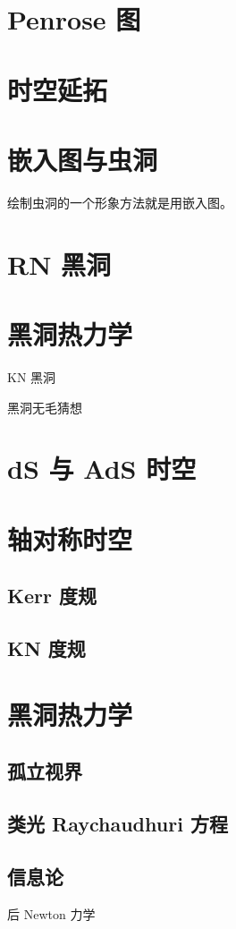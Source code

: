 \section{Penrose 图}

\section{时空延拓}

\section{嵌入图与虫洞}
绘制虫洞的一个形象方法就是用嵌入图。


\section{RN 黑洞}



\section{黑洞热力学}

KN 黑洞

黑洞无毛猜想

\section{dS 与 AdS 时空}\label{sec:dS}



\section{轴对称时空}
    \subsection{Kerr 度规}
    \subsection{KN 度规}

\section{黑洞热力学}
\subsection{孤立视界}
\subsection{类光 Raychaudhuri 方程}
\subsection{信息论}


后 Newton 力学
